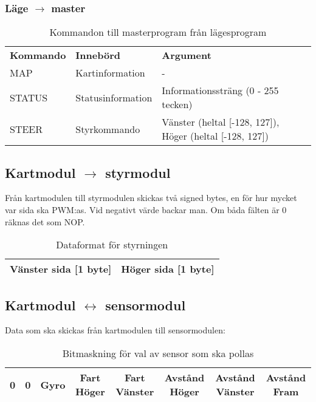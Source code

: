 \subsubsection{Läge $\rightarrow$ master}

\begin{table}[H]
	\caption{Kommandon till masterprogram från lägesprogram}
	\begin{tabular}{l l l}
		\textbf{Kommando} & \textbf{Innebörd} & \textbf{Argument} \\
		MAP	&	Kartinformation		& - \\
		STATUS	&	Statusinformation	& Informationssträng 
		(0 - 255 tecken) \\
		STEER	&	Styrkommando		& Vänster
		(heltal [-128, 127]), Höger (heltal [-128, 127]) \\
	\end{tabular}
\end{table}

\subsection{Kartmodul $\rightarrow$ styrmodul}
Från kartmodulen till styrmodulen skickas två signed bytes, en för hur mycket 
var sida ska PWM:as. Vid negativt värde backar man. Om båda fälten är 0
räknas det som NOP.

\begin{table}[H]
	\caption{Dataformat för styrningen}
	\begin{center}
	\begin{tabular}{| c | c |} \hline
		Vänster sida [1 byte] &
		Höger sida [1 byte] \\ \hline
	\end{tabular}
	\end{center}
\end{table}

\subsection{Kartmodul $\leftrightarrow$ sensormodul}
Data som ska skickas från kartmodulen till sensormodulen:

\begin{table}[H]
	\caption{Bitmaskning för val av sensor som ska pollas}
	\begin{center}
	\begin{tabular}{| c | c | c | c | c | c | c | c |} \hline
		0 & 0 &
		Gyro &
		Fart Höger & Fart Vänster &
		Avstånd Höger & Avstånd Vänster & Avstånd Fram \\ \hline
	\end{tabular}
	\end{center}
\end{table}

